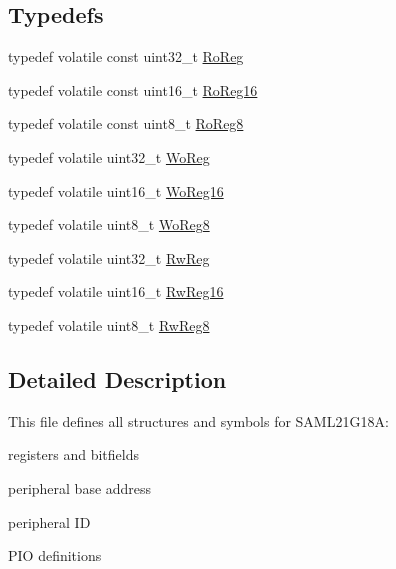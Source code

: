 \subsection*{Typedefs}
\begin{DoxyCompactItemize}
\item 
typedef volatile const uint32\+\_\+t \hyperlink{group___s_a_m_l21_g18_a__definitions_ga5d556f8391af4141be23f7334ac9dd68}{Ro\+Reg}
\item 
typedef volatile const uint16\+\_\+t \hyperlink{group___s_a_m_l21_g18_a__definitions_gaebf6e33c2d49a802e06e22a95ea9d0d0}{Ro\+Reg16}
\item 
typedef volatile const uint8\+\_\+t \hyperlink{group___s_a_m_l21_g18_a__definitions_ga0d957f1433aaf5d70e4dc2b68288442d}{Ro\+Reg8}
\item 
typedef volatile uint32\+\_\+t \hyperlink{group___s_a_m_l21_g18_a__definitions_gac0f96d4e8018367b38f527007cf0eafd}{Wo\+Reg}
\item 
typedef volatile uint16\+\_\+t \hyperlink{group___s_a_m_l21_g18_a__definitions_ga0ab0e5f6c8301aa1c2068e511d854094}{Wo\+Reg16}
\item 
typedef volatile uint8\+\_\+t \hyperlink{group___s_a_m_l21_g18_a__definitions_ga5e336e5a36ee12ebeafb021108e5275b}{Wo\+Reg8}
\item 
typedef volatile uint32\+\_\+t \hyperlink{group___s_a_m_l21_g18_a__definitions_gacf1496e3bbe303e55f627fc7558a68c7}{Rw\+Reg}
\item 
typedef volatile uint16\+\_\+t \hyperlink{group___s_a_m_l21_g18_a__definitions_gacce07556c80fc352ae607f225f19fed5}{Rw\+Reg16}
\item 
typedef volatile uint8\+\_\+t \hyperlink{group___s_a_m_l21_g18_a__definitions_gae361754be775bb192f85821d3ab33c17}{Rw\+Reg8}
\end{DoxyCompactItemize}


\subsection{Detailed Description}
This file defines all structures and symbols for S\+A\+M\+L21\+G18\+A\+:
\begin{DoxyItemize}
\item registers and bitfields
\item peripheral base address
\item peripheral I\+D
\item P\+I\+O definitions 
\end{DoxyItemize}

